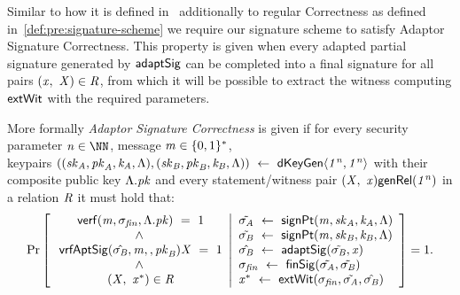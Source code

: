 Similar to how it is defined in~\cite{aumayr2020bitcoinchannels} additionally to regular Correctness as defined in~\ref{def:pre:signature-scheme} we require our signature scheme to satisfy Adaptor Signature Correctness.
This property is given when every adapted partial signature generated by $\mathsf{adaptSig}$ can be completed into a final signature for all pairs $(\mathit{x} ,~ \mathit{X}) \in \mathit{R}$, from which it will
be possible to extract the witness computing $\mathsf{extWit}$ with the required parameters.

\begin{definition}
    \label{def:sig:apt-sig-correctness}
    More formally \emph{Adaptor Signature Correctness} is given if for every security parameter $\varN \in \cnstNatural$, message $\mathit{m} \in \{0,1\}^{*}$, \\ keypairs
    $((\mathit{sk}_{\mathit{A}}, \mathit{pk}_{\mathit{A}}, \mathit{\mathit{k}_{\mathit{A}}}, \Lambda), (\mathit{sk}_{\mathit{B}}, \mathit{pk}_{\mathit{B}}, \mathit{\mathit{k}_{\mathit{B}}}, \Lambda)) ~\leftarrow~ \mathsf{dKeyGen}\langle \mathit{1^n}, \mathit{1^n} \rangle$
    with their composite public key $\Lambda.\mathit{pk}$
    and every statement/witness pair $(\mathit{X} ,~ \mathit{x}) \mathsf{genRel}(\mathit{1^n})$ in a relation $\mathit{R}$ it must hold that:
    \[
        \Pr\left[
        \begin{array}{c}
            \:\mathsf{verf}(\mathit{m}, \sigma_{\mathit{fin}}, \Lambda.\mathit{pk}) ~=~ 1                                         \\
            ~\land~                                                                                              \\
            \: \mathsf{vrfAptSig}(\hat{\sigma_{\mathit{B}}},\mathit{m},,\mathit{pk}_{\mathit{B}}){\mathit{X}} ~=~ 1             \\
            ~\land~                                                                                              \\
            \:(\mathit{X} ,~ \mathit{x}^*) \in \mathit{R}
        \end{array}
        \middle\vert
        \begin{array}{l}
            \tilde{\sigma_{\mathit{A}}} ~\leftarrow~ \mathsf{signPt}(\mathit{m}, \mathit{sk}_{\mathit{A}}, \mathit{\mathit{k}_{\mathit{A}}}, \Lambda)        \\
            \tilde{\sigma_{\mathit{B}}} ~\leftarrow~ \mathsf{signPt}(\mathit{m}, \mathit{sk}_{\mathit{B}}, \mathit{\mathit{k}_{\mathit{B}}}, \Lambda)              \\
            \hat{\sigma_{\mathit{B}}} ~\leftarrow~ \mathsf{adaptSig}(\tilde{\sigma_{\mathit{B}}}, \mathit{x})                                             \\
            \sigma_{\mathit{fin}} ~\leftarrow~ \mathsf{finSig}(\tilde{\sigma_{\mathit{A}}}, \tilde{\sigma_{\mathit{B}}})                                           \\
            \mathit{x}^* ~\leftarrow~ \mathsf{extWit}(\sigma_{\mathit{fin}}, \tilde{\sigma_{\mathit{A}}}, \hat{\sigma_{\mathit{B}}})
        \end{array}
        \right]=1.
    \]
\end{definition}